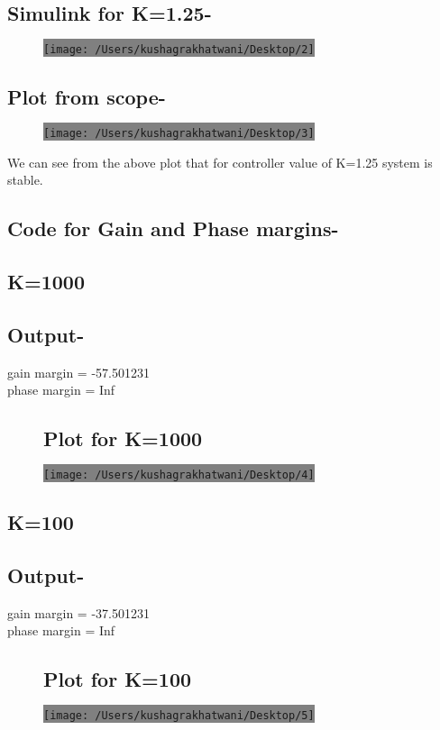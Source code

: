 \documentclass[12pt,A4paper]{article}
\begin{document}
		\subsection*{Simulink for K=1.25-}
	\begin{figure}[H]
		\centering
		\colorbox{gray}{\texttt{[image: /Users/kushagrakhatwani/Desktop/2]}}
	\end{figure}
			\subsection*{Plot from scope-}
				\begin{figure}[H]
		\centering
		\colorbox{gray}{\texttt{[image: /Users/kushagrakhatwani/Desktop/3]}}
	\end{figure}
	We can see from the above plot that for controller value of K=1.25 system is stable.
	\subsection*{Code for Gain and Phase margins-}
		\subsection*{K=1000}
		
			\subsection*{Output-}
			gain margin = -57.501231\\
 phase margin = Inf 
		\begin{figure}[H]
	\subsection*{Plot for K=1000}
		\centering
		\colorbox{gray}{\texttt{[image: /Users/kushagrakhatwani/Desktop/4]}}
	\end{figure}
			\subsection*{K=100}
		
			\subsection*{Output-}
	gain margin = -37.501231\\
 phase margin = Inf 
		\begin{figure}[H]
	\subsection*{Plot for K=100}
		\centering
		\colorbox{gray}{\texttt{[image: /Users/kushagrakhatwani/Desktop/5]}}
	\end{figure}
\end{document}
